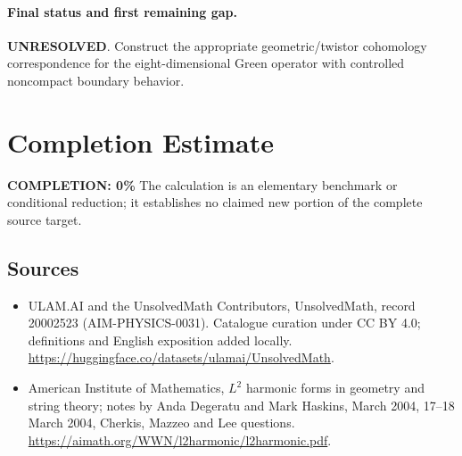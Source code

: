 \documentclass[11pt]{article}
\begin{document}
\paragraph{Final status and first remaining gap.}
\textbf{UNRESOLVED}. Construct the appropriate geometric/twistor cohomology correspondence for the eight-dimensional Green operator with controlled noncompact boundary behavior.

\section{Completion Estimate}
\noindent\textbf{COMPLETION: 0\%}
The calculation is an elementary benchmark or conditional reduction; it establishes no claimed new portion of the complete source target.

\subsection{Sources}
\begin{itemize}
\item[\hypertarget{source:20002523:1}{S1}] ULAM.AI and the UnsolvedMath Contributors, UnsolvedMath, record 20002523 (AIM-PHYSICS-0031). Catalogue curation under CC BY 4.0; definitions and English exposition added locally.
\url{https://huggingface.co/datasets/ulamai/UnsolvedMath}.
\item[\hypertarget{source:20002523:2}{S2}] American Institute of Mathematics, $L^2$ harmonic forms in geometry and string theory; notes by Anda Degeratu and Mark Haskins, March 2004, 17–18 March 2004, Cherkis, Mazzeo and Lee questions.
\url{https://aimath.org/WWN/l2harmonic/l2harmonic.pdf}.
\end{itemize}
\label{end:20002523}
\end{document}
